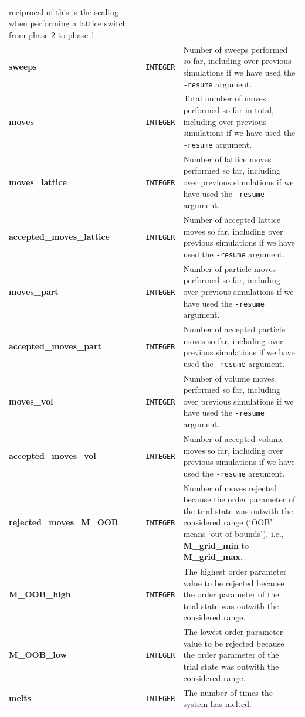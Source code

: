 \documentclass{report}
\begin{document}
\begin{landscape}
\begin{center}
\begin{longtable}{ l l p{8cm}}
reciprocal of this is the scaling when performing a lattice switch from phase 2 to phase 1. \\
\textbf{sweeps} & \texttt{INTEGER} & Number of sweeps performed so far, including over previous simulations if we have used the \texttt{-resume} argument.\\
\textbf{moves} & \texttt{INTEGER} & Total number of moves performed so far in total, including over previous simulations if we have used the \texttt{-resume} 
argument.\\
\textbf{moves\_lattice} & \texttt{INTEGER} & Number of lattice moves performed so far, including over previous simulations if we have used the 
 \texttt{-resume} argument.\\
\textbf{accepted\_moves\_lattice} & \texttt{INTEGER} & Number of accepted lattice moves so far, including over previous simulations if we have used the 
 \texttt{-resume} argument.\\
\textbf{moves\_part} & \texttt{INTEGER} & Number of particle moves performed so far, including over previous simulations if we have used the 
 \texttt{-resume} argument.\\
\textbf{accepted\_moves\_part} & \texttt{INTEGER} & Number of accepted particle moves so far, including over previous simulations if we have used the 
 \texttt{-resume} argument.\\
\textbf{moves\_vol} &\texttt{INTEGER} & Number of volume moves performed so far, including over previous simulations if we have used the 
 \texttt{-resume} argument.\\
\textbf{accepted\_moves\_vol} & \texttt{INTEGER} & Number of accepted volume moves so far, including over previous simulations if we have used the 
 \texttt{-resume} argument.\\
\textbf{rejected\_moves\_M\_OOB} & \texttt{INTEGER} & Number of moves rejected because the order parameter of the trial state was outwith the considered range 
(`OOB' means `out of bounds'), i.e., \textbf{M\_grid\_min} to \textbf{M\_grid\_max}.\\
\textbf{M\_OOB\_high} & \texttt{INTEGER} & The highest order parameter value to be rejected because the order parameter of the trial state was outwith the 
considered range.\\
\textbf{M\_OOB\_low} & \texttt{INTEGER} & The lowest order parameter value to be rejected because the order parameter of the trial state was outwith the considered 
range.\\
\textbf{melts} & \texttt{INTEGER} & The number of times the system has melted. \\

\end{longtable}
\end{center}
\end{landscape}
\end{document}
